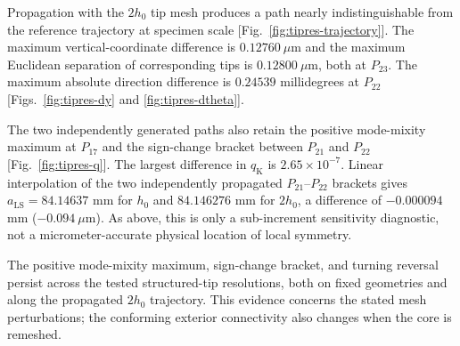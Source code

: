 \documentclass[11pt]{article}
\begin{document}
Propagation with the $2h_0$ tip mesh produces a path nearly
indistinguishable from the reference trajectory at specimen scale
[Fig.~\ref{fig:tipres-trajectory}]. The maximum vertical-coordinate
difference is
$0.12760~\mu\mathrm{m}$ and the maximum Euclidean separation of
corresponding tips is $0.12800~\mu\mathrm{m}$, both at $P_{23}$. The
maximum absolute direction difference is $0.24539$ millidegrees at
$P_{22}$ [Figs.~\ref{fig:tipres-dy} and \ref{fig:tipres-dtheta}].

The two independently generated paths also retain the
positive mode-mixity maximum at $P_{17}$ and the sign-change
bracket between $P_{21}$ and $P_{22}$
[Fig.~\ref{fig:tipres-q}]. The largest difference
in $q_{\mathrm{K}}$ is $2.65\times10^{-7}$.
Linear interpolation of the two independently propagated
$P_{21}$--$P_{22}$ brackets gives
$a_{\mathrm{LS}}=84.14637$ mm for $h_0$ and
$84.146276$ mm for $2h_0$, a difference of
$-0.000094$ mm ($-0.094~\mu\mathrm{m}$). As above, this is only a
sub-increment sensitivity diagnostic, not a micrometer-accurate physical
location of local symmetry.

The positive mode-mixity maximum, sign-change bracket, and
turning reversal persist across the tested structured-tip
resolutions, both on fixed geometries and along the propagated
$2h_0$ trajectory. This evidence concerns the stated
mesh perturbations; the conforming exterior connectivity
also changes when the core is remeshed.
\end{document}
